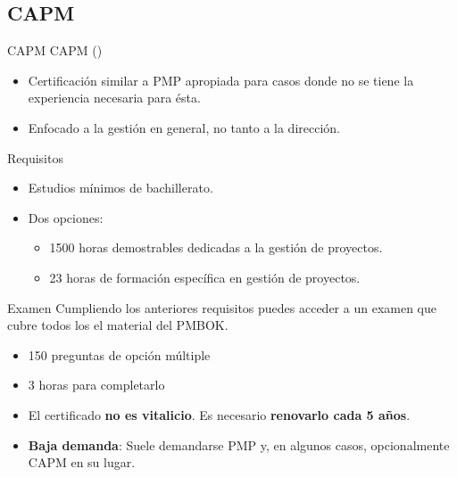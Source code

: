 \subsection{CAPM}

\begin{frame}[allowframebreaks]{CAPM}
	CAPM ()
	\begin{itemize}
		\item Certificación similar a PMP apropiada para casos donde no se tiene la experiencia necesaria para ésta.
		
		\item Enfocado a la gestión en general, no tanto a la dirección.
	\end{itemize}
	
	\begin{block}{Requisitos}
		\begin{itemize}
			\item Estudios mínimos de bachillerato.
			\item Dos opciones:
			\begin{itemize}
				\item 1500 horas demostrables dedicadas a la gestión de proyectos.
				\item 23 horas de formación específica en gestión de proyectos.
			\end{itemize}
		\end{itemize}
	\end{block}
	
	\framebreak
	
	\begin{block}{Examen}
		Cumpliendo los anteriores requisitos puedes acceder a un examen que cubre todos los el material del PMBOK.
		\begin{itemize}
		\item 150 preguntas de opción múltiple
		\item 3 horas para completarlo
		\end{itemize}
	\end{block}
	
	\begin{itemize}
		\item El certificado \textbf{no es vitalicio}. Es necesario \textbf{renovarlo cada 5 años}.
		
		\item \textbf{Baja demanda}: Suele demandarse PMP y, en algunos casos, opcionalmente CAPM en su lugar.
	\end{itemize}
\end{frame}
